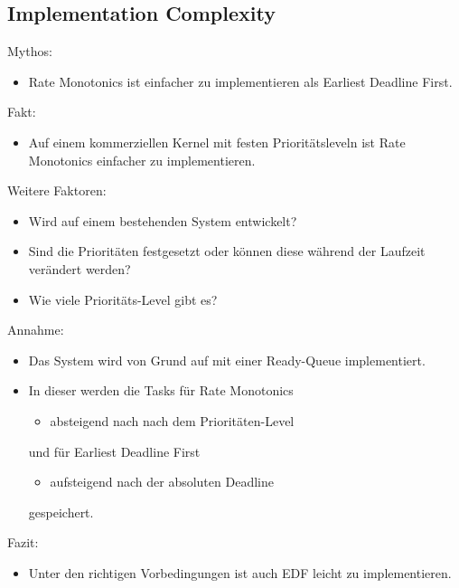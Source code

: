 \subsection{Implementation Complexity}\label{ImplementationComplexity}
\begin{frame}{Mythos:}
	\begin{itemize}
		\item Rate Monotonics ist einfacher zu implementieren als Earliest Deadline First.
	\end{itemize}
\end{frame}

\begin{frame}{Fakt:}
	\begin{itemize}
		\item Auf einem kommerziellen Kernel mit festen Prioritätsleveln ist Rate Monotonics einfacher zu implementieren.
	\end{itemize}
\end{frame}
\begin{frame}{Weitere Faktoren:}
	\begin{itemize}
		\item Wird auf einem bestehenden System entwickelt?
		\item Sind die Prioritäten festgesetzt oder können diese während der Laufzeit verändert werden?
		\item Wie viele Prioritäts-Level gibt es?
	\end{itemize}
\end{frame}

\begin{frame}{Annahme:}
	\begin{itemize}
		\item Das System wird von Grund auf mit einer Ready-Queue implementiert.\pause
		\item In dieser werden die Tasks für Rate Monotonics
			\begin{itemize}
				\item absteigend nach nach dem Prioritäten-Level
			\end{itemize}
			und für Earliest Deadline First
			\begin{itemize}
				\item aufsteigend nach der absoluten Deadline
			\end{itemize} gespeichert.
	\end{itemize}
\end{frame}

\begin{frame}{Fazit:}
	\begin{itemize}
		\item Unter den richtigen Vorbedingungen ist auch EDF leicht zu implementieren.
	\end{itemize}
\end{frame}


